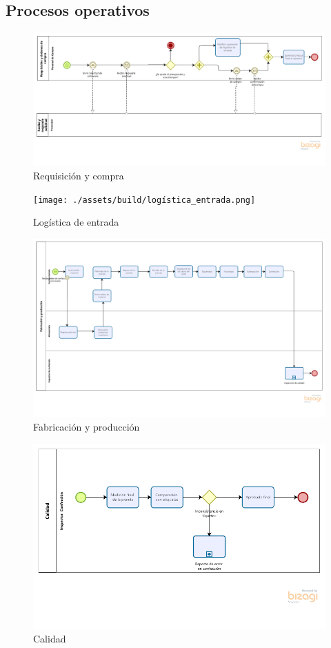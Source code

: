 \documentclass[11pt]{article}
\begin{document}
\subsection{Procesos operativos}
\begin{figure}[H]
\centering
\includegraphics[width=.9\linewidth]{./assets/build/requisicion_compra.png}
\caption{\label{fig:req_compra}Requisición y compra}
\end{figure}

\begin{figure}[H]
\centering
\texttt{[image: ./assets/build/logística\_entrada.png]}
\caption{\label{fig:log_entrada}Logística de entrada}
\end{figure}

\begin{figure}[H]
\centering
\includegraphics[width=.9\linewidth]{./assets/build/fabricacion_produccion.png}
\caption{\label{fig:fab_prod}Fabricación y producción}
\end{figure}

\begin{figure}[H]
\centering
\includegraphics[width=.9\linewidth]{./assets/build/calidad.png}
\caption{\label{fig:calidad} Calidad}
\end{figure}
\end{document}
